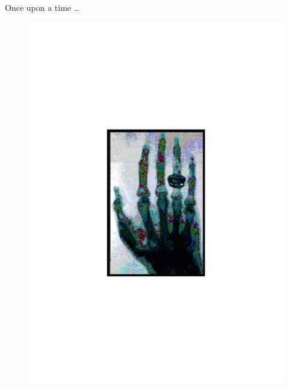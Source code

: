 \begin{frame}{Once upon a time \ldots}
\begin{figure}
\vskip-4cm
\centering
\includegraphics[scale=0.5]{figures/20160216_rsw_roentgenhand.pdf}
\end{figure}
\end{frame}

